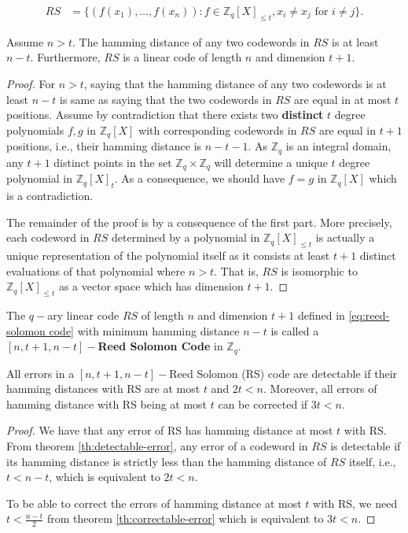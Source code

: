 \begin{align}\label{eq:reed-solomon code}
  RS &= \{(f(x_1),\dots,f(x_n)) : f\in \mathbb{Z}_q[X]_{\leq t}, x_i\neq x_j \text{ for }i\neq j\}.
\end{align}  

\begin{lemma}
  Assume $n>t$. The hamming distance of any two codewords in $RS$ is at least $n-t$. Furthermore, $RS$ is 
  a linear code of length $n$ and dimension $t+1$.
\end{lemma}
\begin{proof}
  For $n>t$, saying that the hamming distance of any two codewords is at least $n-t$ is same as saying 
  that the two codewords in $RS$ are equal in at most $t$ positions. Assume by contradiction that 
  there exists two \textbf{distinct} $t$ degree polynomials $f,g$ in $\mathbb{Z}_q[X]$ with corresponding 
  codewords in $RS$ are equal in $t+1$ positions, i.e., their hamming distance is $n-t-1$. As 
  $\mathbb{Z}_q$ is an integral domain, any $t+1$ distinct points in the set 
  $\mathbb{Z}_q\times\mathbb{Z}_q$ will determine a unique $t$ degree polynomial in $\mathbb{Z}_q[X]_t$. 
  As a consequence, we should have $f=g$ in $\mathbb{Z}_q[X]$ which is a contradiction.\par 

  The remainder of the proof is by a consequence of the first part. More precisely, each codeword in 
  $RS$ determined by a polynomial in $\mathbb{Z}_q[X]_{\leq t}$ is actually a unique representation of the 
  polynomial itself as it consists at least $t+1$ distinct evaluations of that polynomial where $n>t$. 
  That is, $RS$ is isomorphic to $\mathbb{Z}_q[X]_{\leq t}$ as a vector space which has dimension $t+1$.
\end{proof}

\begin{definition}
  The $q-$ary linear code $RS$ of length $n$ and dimension $t+1$ defined in \eqref{eq:reed-solomon code} 
  with minimum hamming distance $n-t$ is called a \textbf{$[n, t+1, n-t]-$Reed Solomon Code}
  \cite{doi:10.1137/0108018} in $\mathbb{Z}_q$.
\end{definition}

\begin{corollary}\label{cor:detectable-correctable RS}
  All errors in a $[n, t+1, n-t]-$Reed Solomon (RS) code are detectable if their hamming distances with 
  RS are at most $t$ and $2t<n$. Moreover, all errors of hamming distance with RS being at most $t$ can 
  be corrected if $3t<n$.
\end{corollary}
\begin{proof}
  We have that any error of RS has hamming distance at most $t$ with RS. From theorem 
  \ref{th:detectable-error}, any error of a codeword in $RS$ is detectable if its hamming 
  distance is strictly less than the hamming distance of $RS$ itself, i.e., $t<n-t$, which is equivalent 
  to $2t<n$.\par

  To be able to correct the errors of hamming distance at most $t$ with RS, we need $t<\frac{n-t}{2}$ from 
  theorem \ref{th:correctable-error} which is equivalent to $3t<n$.
\end{proof}

